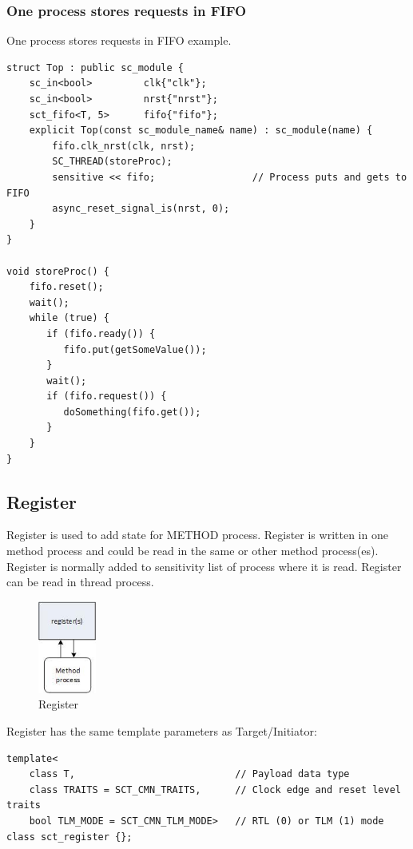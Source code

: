 \subsubsection{One process stores requests in FIFO}

One process stores requests in FIFO example.
\begin{lstlisting}[style=mycpp]
struct Top : public sc_module {
    sc_in<bool>         clk{"clk"};
    sc_in<bool>         nrst{"nrst"};
    sct_fifo<T, 5>      fifo{"fifo"};
    explicit Top(const sc_module_name& name) : sc_module(name) {
        fifo.clk_nrst(clk, nrst);
        SC_THREAD(storeProc); 
        sensitive << fifo;                 // Process puts and gets to FIFO
        async_reset_signal_is(nrst, 0);
    }
}

void storeProc() {
    fifo.reset();
    wait();
    while (true) {
       if (fifo.ready()) {
          fifo.put(getSomeValue());
       }
       wait(); 
       if (fifo.request()) {
          doSomething(fifo.get());
       }
    }
}
\end{lstlisting}


\subsection{Register}

Register is used to add state for METHOD process. Register is written in one method process and could be read in the same or other method process(es). Register is normally added to sensitivity list of process where it is read. Register can be read in thread process.

\begin{figure}[!htb]
\centering
\includegraphics[width=0.17\textwidth]{pics/ss_reg.jpg}
\caption{Register}
\label{fig:ss_reg}
\end{figure}

Register has the same template parameters as Target/Initiator:
\begin{lstlisting}[style=mycpp]
template<
    class T,                            // Payload data type 
    class TRAITS = SCT_CMN_TRAITS,      // Clock edge and reset level traits
    bool TLM_MODE = SCT_CMN_TLM_MODE>   // RTL (0) or TLM (1) mode
class sct_register {};
\end{lstlisting}

